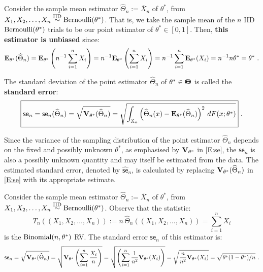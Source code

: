 \begin{example}\label{EX:BiasEstimatePFromNIIDBernoulliTrials}
Consider the sample mean estimator $\widehat{\Theta}_n := \overline{X}_n$ of $\theta^*$, from $X_1,X_2,\ldots,X_n \overset{{\rm IID}}{\sim} \mbox{{\rm Bernoulli}}(\theta^*)$.  That is, we take the sample mean of the $n$ IID $\mbox{{\rm Bernoulli}}(\theta^*)$ trials to be our point estimator of $\theta^*\in[0,1]$.  Then, {\bf this estimator is unbiased} since:
\[
\mathbf{E}_{\theta^*}(\widehat{\Theta}_n) = \mathbf{E}_{\theta^*} \left( n^{-1} \sum_{i=1}^n X_i \right) = n^{-1} \mathbf{E}_{\theta^*} \left(  \sum_{i=1}^n X_i \right) = n^{-1} \sum_{i=1}^n \mathbf{E}_{\theta^*}(X_i) = n^{-1} n \theta^* = \theta^* \ .
\]
\end{example}

\begin{definition}
The standard deviation of the point estimator $\widehat{\Theta}_n$ of  $\theta^* \in {\Theta}\mspace{-11 mu}{\Theta}$ is called the {\bf standard error}:
\begin{equation}\label{E:se}
\boxed{
\mathsf{se}_n = \mathsf{se}_n(\widehat{\Theta}_n)=\sqrt{\mathbf{V}_{\theta^*}(\widehat{\Theta}_n)} = \sqrt{ \int_{\mathbb{X}_n} \left( \widehat{\Theta}_n(x) - \mathbf{E}_{\theta^*}(\widehat{\Theta}_n) \right)^2 \, dF(x;\theta^*)}
}\ .
\end{equation}
\end{definition}
Since the variance of the sampling distribution of the point estimator $\widehat{\Theta}_n$ depends on the fixed and possibly unknown $\theta^*$, as emphasised by $\mathbf{V}_{\theta^*}$ in \eqref{E:se}, the $\mathsf{se}_n$ is also a possibly unknown quantity and may itself be estimated from the data.  The estimated standard error, denoted by $\widehat{\mathsf{se}}_n$, is calculated by replacing $\mathbf{V}_{\theta^*}(\widehat{\Theta}_n)$ in \eqref{E:se} with its appropriate estimate.

\begin{example}\label{EX:StdErrEstimatePFromNIIDBernoulliTrials}
Consider the sample mean estimator $\widehat{\Theta}_n := \overline{X}_n$ of $\theta^*$, from $X_1,X_2,\ldots,X_n \overset{{\rm IID}}{\sim} \mbox{{\rm Bernoulli}}(\theta^*)$.  Observe that the statistic: 
$$T_n((X_1,X_2,\ldots,X_n)) := n \,  \widehat{\Theta}_n((X_1,X_2,\ldots,X_n)) = \sum_{i=1}^n X_i$$ is the $\mbox{{\rm Binomial}}(n,\theta^*)$ RV.
The standard error  $\mathsf{se}_n$ of this estimator is:
\[
\mathsf{se}_n=\sqrt{\mathbf{V}_{\theta^*}(\widehat{\Theta}_n)}
= \sqrt{\mathbf{V}_{\theta^*}\left(\sum_{i=1}^n \frac{X_i}{n} \right)}
= \sqrt{\left(\sum_{i=1}^n \frac{1}{n^2}\mathbf{V}_{\theta^*}(X_i) \right)}
= \sqrt{\frac{n}{n^2}\mathbf{V}_{\theta^*}(X_i)}
=\sqrt{{\theta^*}(1-{\theta^*})/n} \ .
\]
\end{example}

